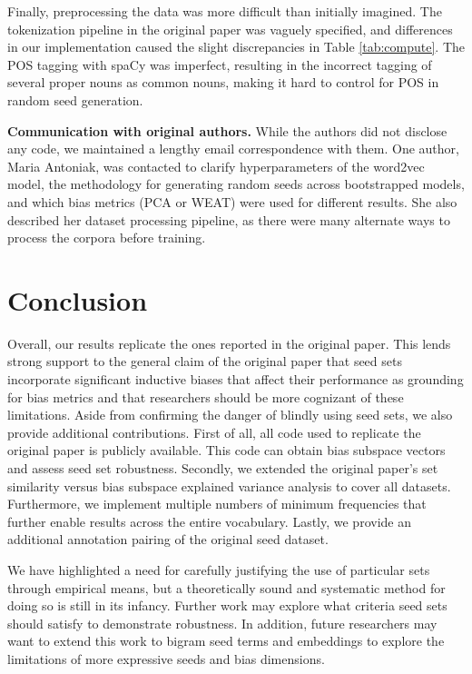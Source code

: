 Finally, preprocessing the data was more difficult than initially imagined. The tokenization
pipeline in the original paper was vaguely specified, and differences in our implementation caused
the slight discrepancies in Table \ref{tab:compute}. The POS tagging with spaCy was imperfect,
resulting in the incorrect tagging of several proper nouns as common nouns, making it hard to
control for POS in random seed generation.

\textbf{Communication with original authors.} While the authors did not disclose any code, we
maintained a lengthy email correspondence with them. One author, Maria Antoniak, was contacted to
clarify hyperparameters of the word2vec model, the methodology for generating random seeds across
bootstrapped models, and which bias metrics (PCA or WEAT) were used for different results. She also
described her dataset processing pipeline, as there were many alternate ways to process the corpora
before training.

\section{Conclusion}

Overall, our results replicate the ones reported in the original paper. This lends strong support to
the general claim of the original paper that seed sets incorporate significant inductive biases that
affect their performance as grounding for bias metrics and that researchers should be more cognizant
of these limitations. Aside from confirming the danger of blindly using seed sets, we also provide
additional contributions. First of all, all code used to replicate the original paper is publicly
available. This code can obtain bias subspace vectors and assess seed set robustness. Secondly, we
extended the original paper's set similarity versus bias subspace explained variance analysis to
cover all datasets. Furthermore, we implement multiple numbers of minimum frequencies that further
enable results across the entire vocabulary. Lastly, we provide an additional annotation pairing of
the original seed dataset.

We have highlighted a need for carefully justifying the use of particular sets through empirical
means, but a theoretically sound and systematic method for doing so is still in its infancy. Further
work may explore what criteria seed sets should satisfy to demonstrate robustness. In addition,
future researchers may want to extend this work to bigram seed terms and embeddings to explore the
limitations of more expressive seeds and bias dimensions.
